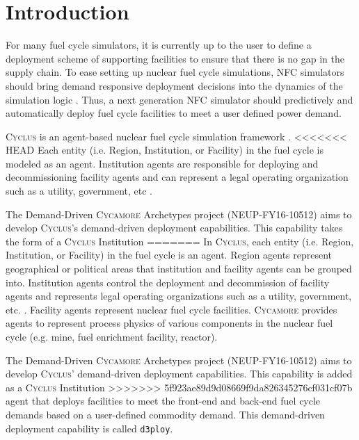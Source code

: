 \documentclass[11pt,letterpaper]{article}
\newcommand{\Cyclus}{\textsc{Cyclus}\xspace}%
\newcommand{\Cycamore}{\textsc{Cycamore}\xspace}%
\newcommand{\deploy}{\texttt{d3ploy}\xspace}%
\begin{document}
\section{Introduction}
For many fuel cycle simulators, it is currently up to the user 
to define a deployment scheme of supporting facilities to ensure 
that there is no gap in the supply chain. 
To ease setting up nuclear fuel cycle simulations, \gls{NFC}
simulators should bring demand responsive deployment decisions into 
the dynamics of the simulation logic \cite{huff_current_2017}. 
Thus, a next generation \gls{NFC} simulator should predictively and 
automatically deploy fuel cycle facilities to meet a user defined 
power demand. 

\Cyclus is an agent-based nuclear fuel cycle simulation framework 
\cite{huff_fundamental_2016}. 
<<<<<<< HEAD
Each entity (i.e. Region, Institution, or Facility) in the fuel 
cycle is modeled as an agent. 
Institution agents
are responsible for deploying and decommissioning facility agents 
and can represent a legal operating organization such as a 
utility, government, etc \cite{huff_fundamental_2016}. 

The Demand-Driven \Cycamore Archetypes project (NEUP-FY16-10512)
aims to develop \Cyclus's demand-driven deployment capabilities. 
This capability takes the form of a \Cyclus Institution
=======
In \Cyclus, each entity (i.e. Region, Institution, or Facility) in the 
fuel cycle is an agent. 
Region agents represent geographical or political areas that institution
and facility agents can be grouped into. 
Institution agents control the 
deployment and decommission of facility agents 
and represents legal operating organizations such as a 
utility, government, etc. \cite{huff_fundamental_2016}. 
Facility agents represent nuclear fuel cycle facilities. 
\Cycamore \cite{carlsen_cycamore_2014}
provides agents to represent process physics of various 
components in the nuclear fuel cycle (e.g. mine, fuel enrichment 
facility, reactor). 

The Demand-Driven \Cycamore Archetypes project (NEUP-FY16-10512) 
aims to develop \Cyclus' demand-driven deployment capabilities. 
This capability is added as a \Cyclus Institution
>>>>>>> 5f923ae89d9d08669f9da826345276cf031cf07b
agent that deploys facilities to meet the front-end and back-end 
fuel cycle demands based on a user-defined commodity demand. 
This demand-driven deployment capability is called 
\deploy. 
\end{document}
